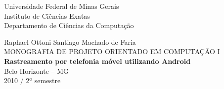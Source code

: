 \begin{titlepage}
\begin{center}
Universidade Federal de Minas Gerais \\
Instituto de Ciências Exatas \\
Departamento de Ciências da Computação \\
\end{center}
\vspace{5em}
\begin{center}
{Raphael Ottoni Santiago Machado de Faria}\\ 
\vspace{10em}
{MONOGRAFIA DE PROJETO ORIENTADO EM COMPUTAÇÃO I} \\
\vspace{1em}
\textbf{Rastreamento por telefonia móvel utilizando Android} \\
\hspace{.45\textwidth} %
\vfill
Belo Horizonte -- MG \\
2010 / 2º semestre
\end{center}
\end{titlepage}
